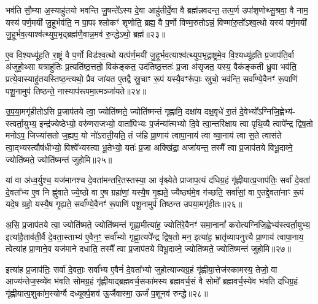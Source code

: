 भव॑ति सौ॒म्या अ॒स्याहु॑तयो भवन्ति जु॒षन्ते᳚\-ऽस्य दे॒वा आहु॑तीर्दे॒वा वै ब्रह्म॑न्नवदन्त॒ तत्प॒र्ण उपा॑शृणोथ्सु॒श्रवा॒ वै नाम॒ यस्य॑ पर्ण॒मयी॑ जु॒हूर्भव॑ति॒ न पा॒पꣴ श्लोकꣳ॑ शृणोति॒ ब्रह्म॒ वै प॒र्णो विण्म॒रुतो\-ऽन्नं॒ विण्मा॑रु॒तो᳚\-ऽश्व॒त्थो यस्य॑ पर्ण॒मयी॑ जु॒हूर्भव॒त्याश्व॑त्थ्युप॒भृद्ब्रह्म॑णै॒वान्न॒मव॑ रु॒न्द्धे\-ऽथो॒ ब्रह्म॑॥२३॥

ए॒व वि॒श्यध्यू॑हति रा॒ष्ट्रं वै प॒र्णो विड॑श्व॒त्थो यत्प॑र्ण॒मयी॑ जु॒हूर्भव॒त्याश्व॑त्थ्युप॒भृद्रा॒ष्ट्रमे॒व वि॒श्यध्यू॑हति प्र॒जाप॑ति॒र्वा अ॑जुहो॒थ्सा यत्राहु॑तिः प्र॒त्यति॑ष्ठ॒त्ततो॒ विक॑ङ्कत॒ उद॑तिष्ठ॒त्ततः॑ प्र॒जा अ॑सृजत॒ यस्य॒ वैक॑ङ्कती ध्रु॒वा भव॑ति॒ प्रत्ये॒वास्याहु॑तयस्तिष्ठ॒न्त्यथो॒ प्रैव जा॑यत ए॒तद्वै स्रु॒चाꣳ रू॒पं यस्यै॒वꣳरू॑पाः॒ स्रुचो॒ भव॑न्ति॒ सर्वा᳚ण्ये॒वैनꣳ॑ रू॒पाणि॑ पशू॒नामुप॑ तिष्ठन्ते॒ नास्याप॑रूपमा॒त्मञ्जा॑यते॥२४॥

{\anuvakamend[{जु॒हूरथो॒ ब्रह्म॑ स्रु॒चाꣳ स॒प्तद॑श च॥७॥}]}

उ॒प॒या॒मगृ॑हीतो\-ऽसि प्र॒जाप॑तये त्वा॒ ज्योति॑ष्मते॒ ज्योति॑ष्मन्तं गृह्णामि॒ दक्षा॑य दक्ष॒वृधे॑ रा॒तं दे॒वेभ्यो᳚\-ऽग्निजि॒ह्वेभ्य॑- स्त्वर्ता॒युभ्य॒ इन्द्र॑ज्येष्ठेभ्यो॒ वरु॑णराजभ्यो॒ वाता॑पिभ्यः प॒र्जन्या᳚त्मभ्यो दि॒वे त्वा॒न्तरि॑क्षाय त्वा पृथि॒व्यै त्वापे᳚न्द्र द्विष॒तो मनो\-ऽप॒ जिज्या॑सतो ज॒ह्यप॒ यो नो॑\-ऽराती॒यति॒ तं ज॑हि प्रा॒णाय॑ त्वापा॒नाय॑ त्वा व्या॒नाय॑ त्वा स॒ते त्वास॑ते त्वा॒द्भ्यस्त्वौष॑धीभ्यो॒ विश्वे᳚भ्यस्त्वा भू॒तेभ्यो॒ यतः॑ प्र॒जा अक्खि॑द्रा॒ अजा॑यन्त॒ तस्मै᳚ त्वा प्र॒जाप॑तये विभू॒दाव्ने॒ ज्योति॑ष्मते॒ ज्योति॑ष्मन्तं जुहोमि॥२५॥

{\anuvakamend[{ओष॑धीभ्य॒श्चतु॑र्दश च॥८॥}]}

यां वा अ॑ध्व॒र्युश्च॒ यज॑मानश्च दे॒वता॑मन्तरि॒तस्तस्या॒ आ वृ॑श्च्येते प्राजाप॒त्यं द॑धिग्र॒हं गृ॑ह्णीयात्प्र॒जाप॑तिः॒ सर्वा॑ दे॒वता॑ दे॒वता᳚भ्य ए॒व नि ह्नु॑वाते ज्ये॒ष्ठो वा ए॒ष ग्रहा॑णां॒ यस्यै॒ष गृ॒ह्यते॒ ज्यैष्ठ्य॑मे॒व ग॑च्छति॒ सर्वा॑सां॒ वा ए॒तद्दे॒वता॑नाꣳ रू॒पं यदे॒ष ग्रहो॒ यस्यै॒ष गृ॒ह्यते॒ सर्वा᳚ण्ये॒वैनꣳ॑ रू॒पाणि॑ पशू॒नामुप॑ तिष्ठन्त उपया॒मगृ॑हीतः॥२६॥

अ॒सि॒ प्र॒जाप॑तये त्वा॒ ज्योति॑ष्मते॒ ज्योति॑ष्मन्तं गृह्णा॒मीत्या॑ह॒ ज्योति॑रे॒वैनꣳ॑ समा॒नानां᳚ करोत्यग्निजि॒ह्वेभ्य॑स्त्वर्ता॒युभ्य॒ इत्या॑है॒ताव॑ती॒र्वै दे॒वता॒स्ताभ्य॑ ए॒वैन॒ꣳ॒ सर्वा᳚भ्यो गृह्णा॒त्यपे᳚न्द्र द्विष॒तो मन॒ इत्या॑ह॒ भ्रातृ॑व्यापनुत्त्यै प्रा॒णाय॑ त्वापा॒नाय॒ त्वेत्या॑ह प्रा॒णाने॒व यज॑माने दधाति॒ तस्मै᳚ त्वा प्र॒जाप॑तये विभू॒दाव्ने॒ ज्योति॑ष्मते॒ ज्योति॑ष्मन्तं जुहोमि॥२७॥

इत्या॑ह प्र॒जाप॑तिः॒ सर्वा॑ दे॒वताः॒ सर्वा᳚भ्य ए॒वैनं॑ दे॒वता᳚भ्यो जुहोत्याज्यग्र॒हं गृ॑ह्णीया॒त्तेज॑स्कामस्य॒ तेजो॒ वा आज्य॑न्तेज॒स्व्ये॑व भ॑वति सोमग्र॒हं गृ॑ह्णीयाद्ब्रह्मवर्च॒सका॑मस्य ब्रह्मवर्च॒सं वै सोमो᳚ ब्रह्मवर्च॒स्ये॑व भ॑वति दधिग्र॒हं गृ॑ह्णीयात्प॒शुका॑म॒स्योर्ग्वै दध्यूर्क्प॒शव॑ ऊ॒र्जैवास्मा॒ ऊर्जं॑ प॒शूनव॑ रुन्द्धे॥२८॥


